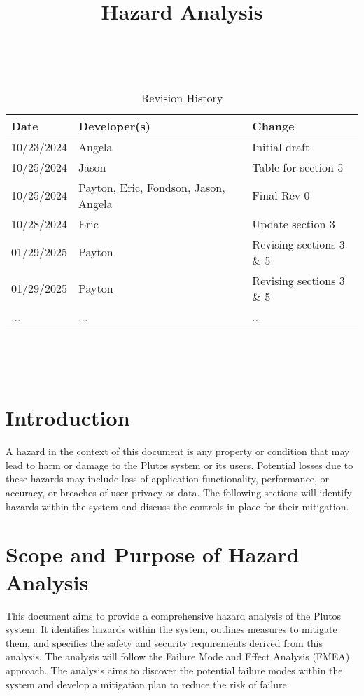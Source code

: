 \documentclass{article}
\title{Hazard Analysis\\\progname}
\author{\authname}
\date{}
\begin{document}
\maketitle
\thispagestyle{empty}

~\newpage


\begin{table}[hp]
\caption{Revision History} \label{TblRevisionHistory}
\begin{tabularx}{\textwidth}{llX}
\toprule
\textbf{Date} & \textbf{Developer(s)} & \textbf{Change}\\
\midrule
10/23/2024 & Angela & Initial draft\\
10/25/2024 & Jason & Table for section 5 \\
10/25/2024 & Payton, Eric, Fondson, Jason, Angela & Final Rev 0 \\
10/28/2024 & Eric & Update section 3\\
01/29/2025 & Payton & Revising sections 3 \& 5\\
01/29/2025 & Payton & Revising sections 3 \& 5\\
... & ... & ... \\
\bottomrule
\end{tabularx}
\end{table}

~\newpage

\tableofcontents

~\newpage


\section{Introduction}

A hazard in the context of this document is any property or condition that may
lead to harm or damage to the Plutos system or its users. Potential losses due
to these hazards may include loss of application functionality, performance, or
accuracy, or breaches of user privacy or data. The following sections will
identify hazards within the system and discuss the controls in place for their
mitigation.


\section{Scope and Purpose of Hazard Analysis}

This document aims to provide a comprehensive hazard analysis of the Plutos
system. It identifies hazards within the system, outlines measures to mitigate
them, and specifies the safety and security requirements derived from this
analysis. The analysis will follow the Failure Mode and Effect Analysis (FMEA)
approach. The analysis aims to discover the potential failure modes within the
system and develop a mitigation plan to reduce the risk of failure. 
\end{document}
